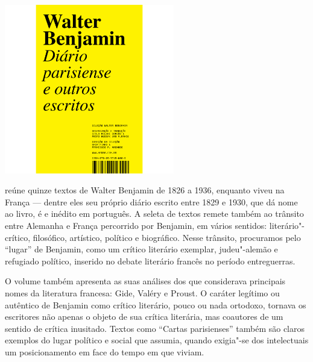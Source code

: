\pagebreak

\begin{center}
\hspace*{-3.6cm}
\hspace*{3.1cm}\includegraphics[width=74mm]{./grid/benjamin2.jpg}
\end{center}

\hspace*{-7cm}\hrulefill\hspace*{-7cm}

\medskip

 reúne quinze textos de Walter Benjamin de 1826 a 1936, enquanto viveu na França --- dentre eles seu próprio diário escrito entre 1829 e 1930, que dá nome ao livro, é e inédito em português. A seleta de textos remete também ao trânsito entre Alemanha e França percorrido por Benjamin, em vários sentidos: literário"-crítico, filosófico, artístico, político e biográfico. Nesse trânsito, procuramos pelo “lugar” de Benjamin, como um crítico literário exemplar, judeu"-alemão e refugiado político, inserido no debate literário francês no período entreguerras.

O volume também apresenta as suas análises dos que considerava principais nomes da literatura francesa: Gide, Valéry e Proust. O caráter legítimo ou autêntico de Benjamin como crítico literário, pouco ou nada ortodoxo, tornava os escritores não apenas o objeto de sua crítica literária, mas coautores de um sentido de crítica inusitado. Textos como “Cartas parisienses” também são claros exemplos do lugar político e social que assumia, quando exigia"-se dos intelectuais um posicionamento em face do tempo em que viviam.


\vfill

